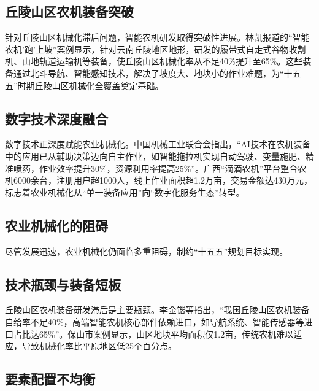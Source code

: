 \documentclass[12pt,fontset=windows]{ctexart}
\begin{document}
\subsection{丘陵山区农机装备突破}

针对丘陵山区机械化滞后问题，智能农机研发取得突破性进展。林凯报道的“智能农机'跑'上坡”案例显示，针对云南丘陵地区地形，研发的履带式自走式谷物收割机、山地轨道运输机等装备，使丘陵山区机械化率从不足40\%提升至65\%\cite{LinKaiZhiNengNongJiPaoShangPoQiuLingNongYeLuGengKuan2025}。这些装备通过北斗导航、智能感知技术，解决了坡度大、地块小的作业难题，为“十五五”时期丘陵山区机械化全覆盖奠定基础。

\subsection{数字技术深度融合}

数字技术正深度赋能农业机械化。中国机械工业联合会指出，“AI技术在农机装备中的应用已从辅助决策迈向自主作业，如智能拖拉机实现自动驾驶、变量施肥、精准喷药，作业效率提升30\%，资源利用率提高25\%”\cite{BenKanBianJiBuMaoDingShiWuWuAILingXinCheng2025YangGuoQiShuZhiHuaZhuanXingYuZhiNengZhiZaoLunTanZaiJingZhaoKai2025}。广西“滴滴农机”平台整合农机6000余台，注册用户超1000人，线上作业面积超1.2万亩，交易金额达430万元\cite{MaoMeiYanShuZiJiShuDuiNongYeChanYeLianXianDaiHuaDeKongJianYiChuXiaoYingJiYingXiangJiZhi2025}，标志着农业机械化从“单一装备应用”向“数字化服务生态”转型。

\subsection{农业机械化的阻碍}

尽管发展迅速，农业机械化仍面临多重阻碍，制约“十五五”规划目标实现。

\subsection{技术瓶颈与装备短板}

丘陵山区农机装备研发滞后是主要瓶颈。李金锴等指出，“我国丘陵山区农机装备自给率不足40\%，高端智能农机核心部件依赖进口，如导航系统、智能传感器等进口占比达65\%”\cite{LiJinKaiRenGongZhiNengFuNengNongYeLuSeZhuanXingDeZuoYongJiZhiXianShiKunJingYuTuiJinLuJing2025}。保山市案例显示，山区地块平均面积仅1.2亩，传统农机难以适应，导致机械化率比平原地区低25个百分点\cite{FuHuaPingShenGengWoYeJiXianXingWoShiYiNongJiHuaGaiGeHuiJiuNongYeZhenXingXinTuJing2025}。

\subsection{要素配置不均衡}
\end{document}
